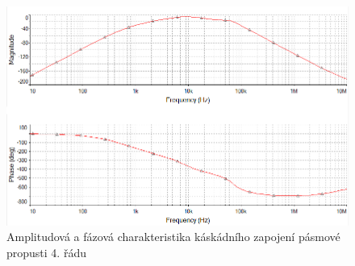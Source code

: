 \documentclass[twoside]{article}
\begin{document}
\begin{figure}[H]
\centering
\includegraphics[scale=0.75]{lrcbandpass4ampl.png}
\caption{Amplitudová a fázová charakteristika káskádního zapojení pásmové propusti 4. řádu}
\end{figure}
\end{document}
